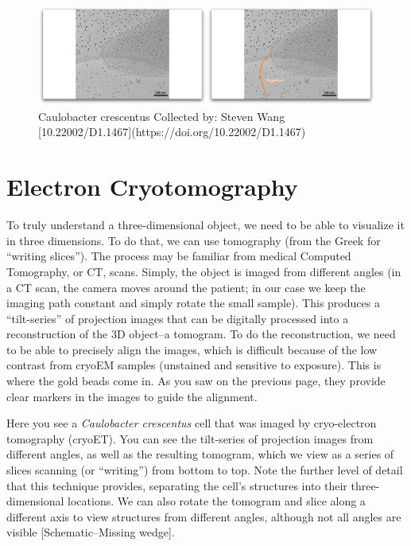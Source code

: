 \documentclass[]{tufte-book}
\begin{document}
\begin{figure}
\includegraphics{movie_stills/1_5} \caption[Caulobacter crescentus Collected by]{Caulobacter crescentus Collected by: Steven Wang [10.22002/D1.1467](https://doi.org/10.22002/D1.1467)}\label{fig:unnamed-chunk-8}
\end{figure}

\section{Electron Cryotomography}\label{electron-cryotomography}

To truly understand a three-dimensional object, we need to be able to
visualize it in three dimensions. To do that, we can use tomography
(from the Greek for ``writing slices''). The process may be familiar
from medical Computed Tomography, or CT, scans. Simply, the object is
imaged from different angles (in a CT scan, the camera moves around the
patient; in our case we keep the imaging path constant and simply rotate
the small sample). This produces a ``tilt-series'' of projection images
that can be digitally processed into a reconstruction of the 3D
object--a tomogram. To do the reconstruction, we need to be able to
precisely align the images, which is difficult because of the low
contrast from cryoEM samples (unstained and sensitive to exposure). This
is where the gold beads come in. As you saw on the previous page, they
provide clear markers in the images to guide the alignment.

Here you see a \emph{Caulobacter crescentus} cell that was imaged by
cryo-electron tomography (cryoET). You can see the tilt-series of
projection images from different angles, as well as the resulting
tomogram, which we view as a series of slices scanning (or ``writing'')
from bottom to top. Note the further level of detail that this technique
provides, separating the cell's structures into their three-dimensional
locations. We can also rotate the tomogram and slice along a different
axis to view structures from different angles, although not all angles
are visible {[}Schematic--Missing wedge{]}.
\end{document}
